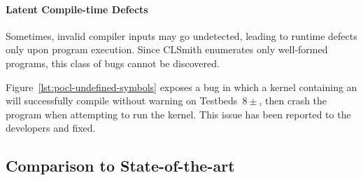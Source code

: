\paragraph{Latent Compile-time Defects} Sometimes, invalid compiler inputs may go undetected, leading to runtime defects only upon program execution. Since CLSmith enumerates only well-formed programs, this class of bugs cannot be discovered.

Figure~\ref{lst:pocl-undefined-symbols} exposes a bug in which a kernel containing an  will successfully compile without warning on Testbeds~$8\pm$, then crash the program when attempting to run the kernel. This issue has been reported to the developers and fixed.

%
%
%
%
%


\subsection{Comparison to State-of-the-art}%
\label{subsec:vs_clsmith}

